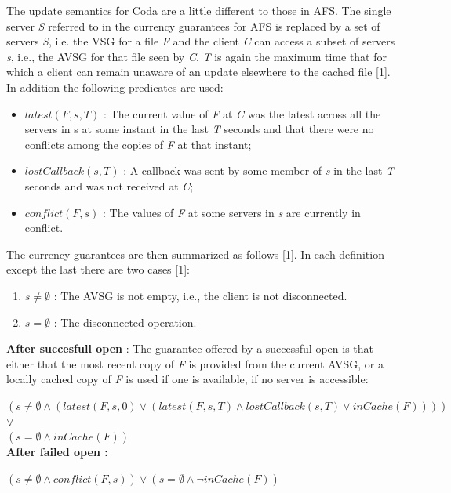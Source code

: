 The update semantics for Coda are a little different to those in AFS. The single server \textit{S} referred to in the currency guarantees for AFS is replaced by a set of servers \textit{S}, i.e. the VSG for a file \textit{F} and the client \textit{C} can access a subset of servers \textit{s}, i.e., the AVSG for that file seen by \textit{C}. \textit{T} is again the maximum time that for which a client can remain unaware of an update elsewhere to the cached file [1]. In addition the following predicates are used:
\begin{itemize}
	\item $latest(F, s, T)$ : The current value of \textit{F} at \textit{C} was the latest across all the servers in s at some instant in the last \textit{T} seconds and that there were no conflicts among the copies of \textit{F} at that instant;
	\item $lostCallback(s, T)$ : A callback was sent by some member of \textit{s} in the last \textit{T} seconds and was not received at \textit{C};
	\item $conflict(F,s)$ : The values of \textit{F} at some servers in \textit{s} are currently in conflict.
\end{itemize}


The currency guarantees are then summarized as follows [1]. In each definition except the last there are two cases [1]:
\begin{enumerate}
	\item $s \neq \emptyset$ : The AVSG is not empty, i.e., the client is not disconnected.
	\item $s = \emptyset$ : The disconnected operation.
\end{enumerate}

\textbf{After succesfull open} : The guarantee offered by a successful open is that either that the most recent copy of \textit{F} is provided from the current AVSG, or a locally cached copy of \textit{F} is used if one is available, if no server is accessible:

$(s \neq \emptyset \wedge (latest(F, s, 0) \vee (latest(F, s, T) \wedge lostCallback(s, T) \vee inCache(F))))$ \\
$\vee$ \\
$(s = \emptyset \wedge inCache(F))$ \\

\textbf{After failed open :}

$(s \neq \emptyset \wedge conflict(F, s)) \vee (s = \emptyset \wedge \neg inCache(F))$ \\

